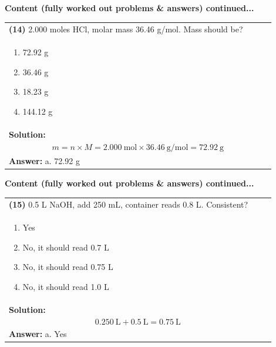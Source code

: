 \documentclass{article}
\begin{document}
{\newpage
\noindent
{\large\textbf{Content (fully worked out problems \& answers) continued...}}\\[0.2em]
\vspace{0.2cm}
\begin{tabular}{|p{0.9\linewidth}|}
\hline
\vspace{0.2cm}
\textbf{(14)} 2.000 moles HCl, molar mass 36.46 g/mol. Mass should be? \\
\begin{minipage}[t]{0.85\linewidth}
\begin{enumerate}[label=\alph*.]
   \item 72.92 g
   \item 36.46 g
   \item 18.23 g
   \item 144.12 g
\end{enumerate}
\end{minipage}\\
\hline
\vspace{0.2cm}
\textbf{Solution:} \\
\[
m = n \times M = 2.000~\text{mol} \times 36.46~\text{g/mol} = 72.92~\text{g}
\] \\ 
\hline
\textbf{Answer:} a. 72.92 g \\
\hline
\end{tabular}

\newpage
\noindent
{\large\textbf{Content (fully worked out problems \& answers) continued...}}\\[0.2em]
\vspace{0.2cm}
\begin{tabular}{|p{0.9\linewidth}|}
\hline
\vspace{0.2cm}
\textbf{(15)} 0.5 L NaOH, add 250 mL, container reads 0.8 L. Consistent? \\
\begin{minipage}[t]{0.85\linewidth}
\begin{enumerate}[label=\alph*.]
   \item Yes
   \item No, it should read 0.7 L
   \item No, it should read 0.75 L
   \item No, it should read 1.0 L
\end{enumerate}
\end{minipage}\\
\hline
\vspace{0.2cm}
\textbf{Solution:} \\
\[
0.250~\text{L} + 0.5~\text{L} = 0.75~\text{L} 
\] \\ 
\hline
\vspace{0.2cm}
\textbf{Answer:} a. Yes \\
\hline
\end{tabular}

}
\end{document}
